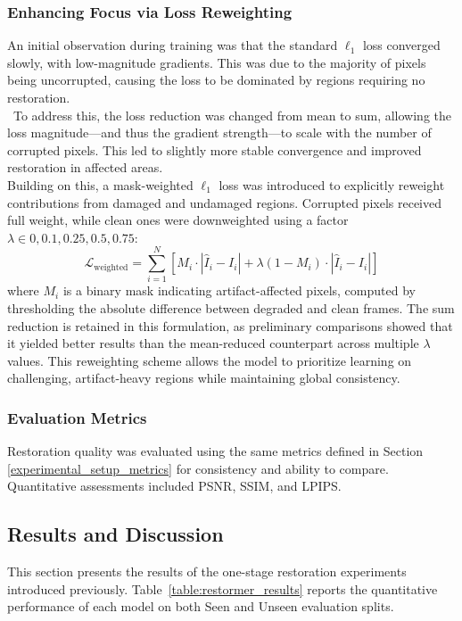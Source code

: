 \documentclass[10pt,a4paper,twocolumn,twoside]{article}
\begin{document}
\subsubsection{Enhancing Focus via Loss Reweighting}
An initial observation during training was that the standard $\ell_1$ loss converged slowly, with low-magnitude gradients. This was due to the majority of pixels being uncorrupted, causing the loss to be dominated by regions requiring no restoration. \\\ To address this, the loss reduction was changed from mean to sum, allowing the loss magnitude—and thus the gradient strength—to scale with the number of corrupted pixels. This led to slightly more stable convergence and improved restoration in affected areas. \\ Building on this, a mask-weighted $\ell_1$ loss was introduced to explicitly reweight contributions from damaged and undamaged regions. Corrupted pixels received full weight, while clean ones were downweighted using a factor $\lambda \in {0, 0.1, 0.25, 0.5, 0.75}$:
\begin{equation*}
\mathcal{L}_{\text{weighted}} = \sum_{i=1}^N \left[ M_i \cdot |\hat{I}_i - I_i| + \lambda (1 - M_i) \cdot |\hat{I}_i - I_i| \right]
\end{equation*}
where $M_i$ is a binary mask indicating artifact-affected pixels, computed by thresholding the absolute difference between degraded and clean frames. The sum reduction is retained in this formulation, as preliminary comparisons showed that it yielded better results than the mean-reduced counterpart across multiple $\lambda$ values. This reweighting scheme allows the model to prioritize learning on challenging, artifact-heavy regions while maintaining global consistency.
\subsubsection{Evaluation Metrics}
Restoration quality was evaluated using the same metrics defined in Section \ref{experimental_setup_metrics} for consistency and ability to compare. Quantitative assessments included PSNR, SSIM, and LPIPS. 

\subsection{Results and Discussion}

This section presents the results of the one-stage restoration experiments introduced previously. Table~\ref{table:restormer_results} reports the quantitative performance of each model on both Seen and Unseen evaluation splits.
\end{document}
